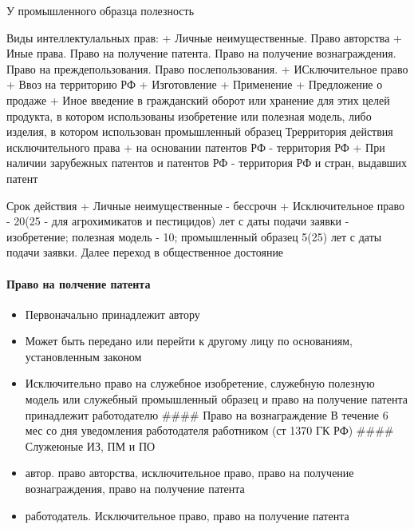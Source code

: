 \documentclass[12pt]{article}
\begin{document}
У промышленного образца полезность

Виды интеллектулальных прав: + Личные неимущественные. Право авторства +
Иные права. Право на получение патента. Право на получение
вознаграждения. Право на преждепользования. Право послепользования. +
ИСключительное право + Ввоз на территорию РФ + Изготовление + Применение
+ Предложение о продаже + Иное введение в гражданский оборот или
хранение для этих целей продукта, в котором использованы изобретение или
полезная модель, либо изделия, в котором использован промышленный
образец Трерритория действия исключительного права + на основании
патентов РФ - территория РФ + При наличии зарубежных патентов и патентов
РФ - территория РФ и стран, выдавших патент

Срок действия + Личные неимущественные - бессрочн + Исключительное право
- 20(25 - для агрохимикатов и пестицидов) лет с даты подачи заявки -
изобретение; полезная модель - 10; промышленный образец 5(25) лет с даты
подачи заявки. Далее переход в общественное достояние

\hypertarget{ux43fux440ux430ux432ux43e-ux43dux430-ux43fux43eux43bux447ux435ux43dux438ux435-ux43fux430ux442ux435ux43dux442ux430}{%
\paragraph{Право на полчение
патента}\label{ux43fux440ux430ux432ux43e-ux43dux430-ux43fux43eux43bux447ux435ux43dux438ux435-ux43fux430ux442ux435ux43dux442ux430}}

\begin{itemize}
\item
  Первоначально принадлежит автору
\item
  Может быть передано или перейти к другому лицу по основаниям,
  установленным законом
\item
  Исключительно право на служебное изобретение, служебную полезную
  модель или служебный промышленный образец и право на получение патента
  принадлежит работодателю \#\#\#\# Право на вознаграждение В течение 6
  мес со дня уведомления работодателя работником (ст 1370 ГК РФ)
  \#\#\#\# Служеюные ИЗ, ПМ и ПО
\item
  автор. право авторства, исключительное право, право на получение
  вознаграждения, право на получение патента
\item
  работодатель. Исключительное право, право на получение патента
\end{itemize}
\end{document}
